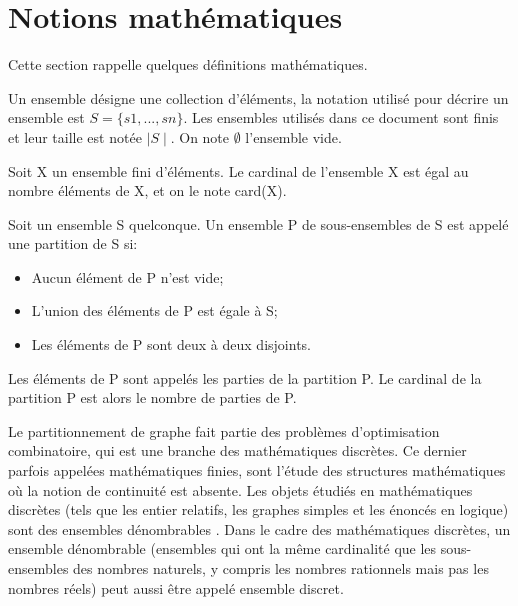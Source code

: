 
\section{Notions mathématiques}
Cette section rappelle quelques définitions mathématiques.
\begin{definition}[Ensemble]
Un ensemble désigne une collection d'éléments, la notation utilisé pour décrire un ensemble est $S =\{s1, . . ., sn\}$. Les ensembles utilisés dans ce document sont finis et leur taille est notée $\mid S \mid$. On note $\emptyset$ l'ensemble vide.
\end{definition}

\begin{definition}
Soit X un ensemble fini d'éléments. Le cardinal de l'ensemble X est égal au nombre éléments de X, et on le note card(X).
\end{definition}

\begin{definition}[Partition]
Soit un ensemble S quelconque. Un ensemble P de sous-ensembles de S est appelé une partition de S si:
\begin{itemize}
	\item Aucun élément de P n'est vide;
	\item L'union des éléments de P est égale à S;
	\item Les éléments de P sont deux à deux disjoints.
\end{itemize}
 Les éléments de P sont appelés les parties de la partition P. Le cardinal de la partition P est alors le nombre de parties de P.
\end{definition}

Le partitionnement de graphe fait partie des problèmes d'optimisation combinatoire, qui est une branche des mathématiques discrètes. Ce dernier parfois appelées mathématiques finies, sont l'étude des structures mathématiques où la notion de continuité est absente. Les objets étudiés en mathématiques discrètes (tels que les entier relatifs, les graphes simples et les énoncés en logique) sont des ensembles dénombrables \citep{Norman1989}. Dans le cadre des mathématiques discrètes, un ensemble dénombrable (ensembles qui ont la même cardinalité que les sous-ensembles des nombres naturels, y compris les nombres rationnels mais pas les nombres réels) peut aussi être appelé ensemble discret.